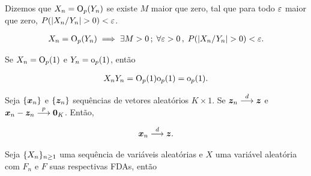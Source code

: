 \documentclass[11pt, oneside, a4paper, article]{article}
\numberwithin{equation}{section}
\begin{document}
\begin{description}
\begin{defn}
	\citet[Def 3.4, p.36]{wool-2010}

	Dizemos que
	$X_{n} = \text{O}_{p}(Y_{n})$ se existe $M$ maior que zero, tal que para todo $\varepsilon$ maior que zero, $P( | X_{n}/Y_{n} | > 0) < \varepsilon$.

	\vspace{-1 em}
	\begin{align*}
		X_{n} = \text{O}_{p}(Y_{n}) \implies \exists M > 0 \, ; \;
		\forall \varepsilon > 0 \, , \;
		P( | X_{n}/Y_{n} | > 0) < \varepsilon.
	\end{align*}
\end{defn}

\begin{lem}
	\citet[Lemma 3.2, p.36]{wool-2010}

	Se
	$X_{n} = \text{O}_{p}(1)$ e $Y_{n} = \text{o}_{p}(1)$, então

	\vspace{-1 em}
	\begin{align*}
		X_{n} Y_{n} = \text{O}_{p}(1) \text{o}_{p}(1) = \text{o}_{p}(1).
	\end{align*}
\end{lem}

\begin{lem} \label{lem:equiv:assin}
	\citet[Lemma 3.7, p.39]{wool-2010}

	Seja
	$\{\boldsymbol{x}_{n}\}$ e $\{\boldsymbol{z}_{n}\}$
	sequências de vetores aleatórios $K \times 1$.
	Se $\boldsymbol{z}_{n}  \overset{d}{\longrightarrow}  \boldsymbol{z}$ e 
	$\boldsymbol{x}_{n} - \boldsymbol{z}_{n}  \overset{p}{\longrightarrow}  \boldsymbol{0}_{K}$.
	Então, 

	\vspace{-1 em}
	\begin{align*}
		\boldsymbol{x}_{n}  \overset{d}{\longrightarrow}  \boldsymbol{z}.
	\end{align*}

\end{lem}

\begin{defn}
	\citet[Def 3.6, p.38]{wool-2010}

	Seja
	$\{X_{n}\}_{n \geq 1}$  uma sequência de variáveis aleatórias e $X$ uma variável aleatória com $F_{n}$ e $F$ suas respectivas FDAs, então


\end{defn}
\end{description}
\end{document}
